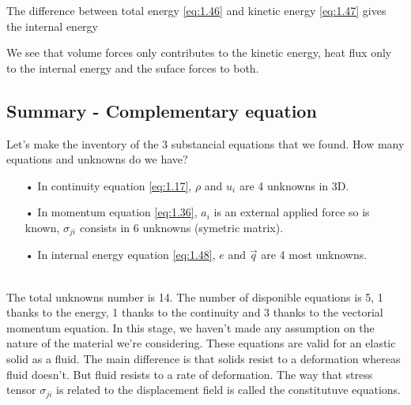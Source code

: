 		\begin{center}
		\end{center}
		The difference between total energy \eqref{eq:1.46} and kinetic energy \eqref{eq:1.47} gives the internal energy
		
		\begin{center}
		\end{center}
		We see that volume forces only contributes to the kinetic energy, heat flux only to the internal energy and the suface forces to both. 
		
	\subsection{Summary - Complementary equation}
		Let's make the inventory of the 3 substancial equations that we found. How many equations and unknowns do we have? 
	\begin{itemize}
		\item[•] In continuity equation \eqref{eq:1.17}, $\rho$ and $u_i$ are 4 unknowns in 3D. 
		\item[•] In momentum equation \eqref{eq:1.36}, $a_i$ is an external applied force so is known, $\sigma _{ji}$ consists in 6 unknowns (symetric matrix).
		\item[•] In internal energy equation \eqref{eq:1.48}, $e$ and $\vec{q}$ are 4 most unknowns. 
	\end{itemize}			
	\ \\
	The total unknowns number is 14.  The number of disponible equations is 5, 1 thanks to the energy, 1 thanks to the continuity and 3 thanks to the vectorial momentum equation. In this stage, we haven't made any assumption on the nature of the material we're considering. These equations are valid for an elastic solid as a fluid. The main difference is that solids resist to a deformation whereas fluid doesn't. But fluid resists to a rate of deformation. The way that stress tensor $\sigma _{ji}$ is related to the displacement field is called the constitutuve equations. 
	
